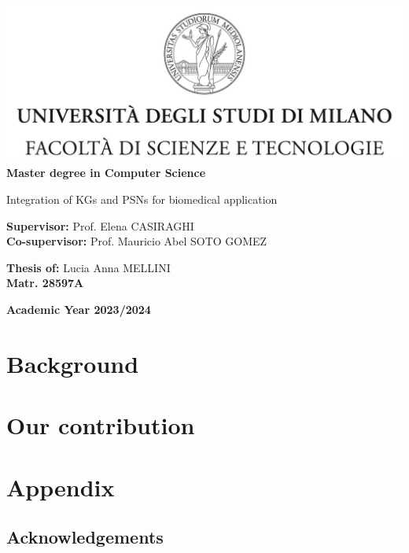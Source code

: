 \documentclass[12pt,a4paper]{report}
\begin{document}
\begin{titlepage}
    \begin{center}
    \includegraphics[width=\textwidth]{Logo.jpg}\\
    {\Large{\bf Master degree in Computer Science}}
    \end{center}
    \vspace{12mm}
    \begin{center}
        \begin{doublespace}
            {\huge Integration of KGs and PSNs for biomedical application}
        \end{doublespace}
    
    \end{center}
    \vspace{12mm}
    \begin{flushleft}
    {\large{\bf Supervisor:}}
    {\large{Prof. Elena CASIRAGHI}}\\
    \vspace{4mm}
    {\large{\bf Co-supervisor:}}
    {\large{Prof. Mauricio Abel SOTO GOMEZ}}\\
    \end{flushleft}
    \vspace{12mm}
    \begin{flushright}
    {\large{\bf Thesis of:}}
    {\large{Lucia Anna MELLINI}}\\
    {\large{\bf Matr. 28597A}}\\
    \end{flushright}
    \vspace{4mm}
    \begin{center}
    {\large{\bf Academic Year 2023/2024}}
    \end{center}
\end{titlepage}
    
\tableofcontents
   

\part{Background}



\part{Our contribution}







\appendix
\cleardoublepage
\part*{Appendix}


\chapter*{Acknowledgements}
\end{document}

